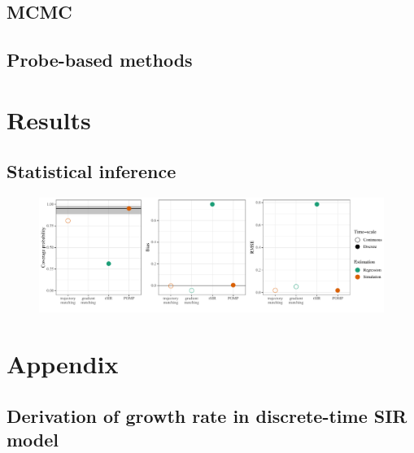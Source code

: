 \documentclass{article}
\begin{document}
\subsection{MCMC}

\subsection{Probe-based methods}

\section{Results}

\subsection{Statistical inference}

\begin{figure}[t]
\includegraphics[width=\textwidth]{../figure/compare_estimate_sir.pdf}
\end{figure}





\pagebreak

\section{Appendix}

\subsection{Derivation of growth rate in discrete-time SIR model}
\end{document}
